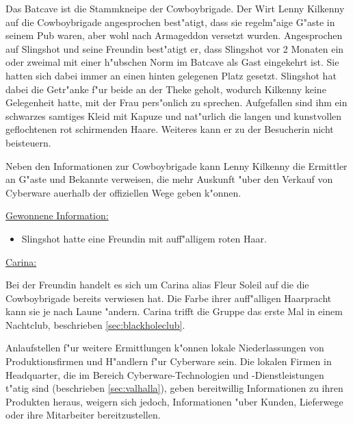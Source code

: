 
Das Batcave ist die Stammkneipe der Cowboybrigade. Der Wirt Lenny Kilkenny auf die Cowboybrigade angesprochen best"atigt, dass sie regelm"a\3ige G"aste in seinem Pub waren, aber wohl nach Armageddon versetzt wurden. Angesprochen auf Slingshot und seine Freundin best"atigt er, dass Slingshot vor 2 Monaten ein oder zweimal mit einer h"ubschen Norm im Batcave als Gast eingekehrt ist. Sie hatten sich dabei immer an einen hinten gelegenen Platz gesetzt. Slingshot hat dabei die Getr"anke f"ur beide an der Theke geholt, wodurch Kilkenny keine Gelegenheit hatte, mit der Frau pers"onlich zu sprechen. Aufgefallen sind ihm ein schwarzes samtiges Kleid mit Kapuze und nat"urlich die langen und kunstvollen geflochtenen rot schirmenden Haare. Weiteres kann er zu der Besucherin nicht beisteuern.

Neben den Informationen zur Cowboybrigade kann Lenny Kilkenny die Ermittler an G"aste und Bekannte verweisen, die mehr Auskunft "uber den Verkauf von Cyberware au\3erhalb der offiziellen Wege geben k"onnen.

\begin{remarks}
	\underline{Gewonnene Information:}
	
	\begin{itemize}
		\item Slingshot hatte eine Freundin mit auff"alligem roten Haar.
	\end{itemize}
	
	\underline{Carina:}

	Bei der Freundin handelt es sich um Carina alias Fleur Soleil auf die die Cowboybrigade bereits verwiesen hat. Die Farbe ihrer auff"alligen Haarpracht kann sie je nach Laune "andern. Carina trifft die Gruppe das erste Mal in einem Nachtclub, beschrieben  \cref{sec:blackholeclub}.
\end{remarks}	


Anlaufstellen f"ur weitere Ermittlungen k"onnen lokale Niederlassungen von Produktionsfirmen und H"andlern f"ur Cyberware sein. Die lokalen Firmen in Headquarter, die im Bereich Cyberware-Technologien und -Dienstleistungen t"atig sind (beschrieben \cref{sec:valhalla}), geben bereitwillig Informationen zu ihren Produkten heraus, weigern sich jedoch, Informationen "uber Kunden, Lieferwege oder ihre Mitarbeiter bereitzustellen.

